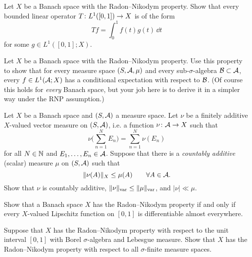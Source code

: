 \begin{exercise}
  Let $X$ be a Banach space with the Radon--Nikodym property.
  Show that every bounded linear operator $T \colon L^1([0,1]) \rightarrow X$ is of the form
  \begin{equation*}
    Tf = \int_0^1 f(t) g(t) \, \dd t
  \end{equation*}
  for some $g \in L^1([0,1];X)$.
\end{exercise}

\begin{exercise}
  Let $X$ be a Banach space with the Radon--Nikodym property.
  Use this property to show that for every measure space $(S,\mathcal{A},\mu)$ and every sub-$\sigma$-algebra $\mathcal{B} \subset \mathcal{A}$, every $f \in L^1(\mathcal{A};X)$ has a conditional expectation with respect to $\mathcal{B}$.
  (Of course this holds for \emph{every} Banach space, but your job here is to derive it in a simpler way under the RNP assumption.)
\end{exercise}

\begin{exercise}\label{ex:fa-meas-ca}
  Let $X$ be a Banach space and $(S,\mathcal{A})$ a measure space.
  Let $\nu$ be a finitely additive $X$-valued vector measure on $(S,\mathcal{A})$, i.e. a function $\nu \colon \mathcal{A} \rightarrow X$ such that
  \begin{equation*}
    \nu\Big(\sum_{n=1}^{N} E_n\Big) = \sum_{n=1}^{N} \nu(E_n)
  \end{equation*}
  for all $N \in \mathbb{N}$ and $E_1,\ldots,E_n \in \mathcal{A}$.
  Suppose that there is a \emph{countably additive} (scalar) measure $\mu$ on $(S,\mathcal{A})$ such that
  \begin{equation*}
    \|\nu(A)\|_{X} \leq \mu(A) \qquad \forall A \in \mathcal{A}.
  \end{equation*}
  Show that $\nu$ is countably additive, $\|\nu\|_{\mathrm{var}} \leq \|\mu\|_{\mathrm{var}}$, and $|\nu| \ll \mu$.
\end{exercise}

\begin{exercise}
  Show that a Banach space $X$ has the Radon--Nikodym property if and only if every $X$-valued Lipschitz function on $[0,1]$ is differentiable almost everywhere.
\end{exercise}

\begin{exercise}\label{ex:RNP-unitinterval}
  Suppose that $X$ has the Radon--Nikodym property with respect to the unit interval $[0,1]$ with Borel $\sigma$-algebra and Lebesgue measure.
  Show that $X$ has the Radon--Nikodym property with respect to all $\sigma$-finite measure spaces.
\end{exercise}




